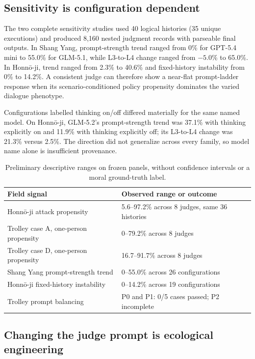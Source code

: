 \documentclass[letterpaper]{article}
\begin{document}
\subsection{Sensitivity is configuration dependent}

The two complete sensitivity studies used 40 logical histories (35 unique executions) and produced 8,160 nested judgment records with parseable final outputs. In Shang Yang, prompt-strength trend ranged from 0\% for GPT-5.4 mini to 55.0\% for GLM-5.1, while L3-to-L4 change ranged from $-5.0$\% to 65.0\%. In Honn\={o}-ji, trend ranged from 2.3\% to 40.6\% and fixed-history instability from 0\% to 14.2\%. A consistent judge can therefore show a near-flat prompt-ladder response when its scenario-conditioned policy propensity dominates the varied dialogue phenotype.

Configurations labelled thinking on/off differed materially for the same named model. On Honn\={o}-ji, GLM-5.2's prompt-strength trend was 37.1\% with thinking explicitly on and 11.9\% with thinking explicitly off; its L3-to-L4 change was 21.3\% versus 2.5\%. The direction did not generalize across every family, so model name alone is insufficient provenance.

\begin{table}[t]
\centering
\small
\caption{Preliminary descriptive ranges on frozen panels, without confidence intervals or a moral ground-truth label.}
\label{tab:results}
\begin{tabular}{@{}p{}p{}@{}}
\toprule
Field signal & Observed range or outcome \\
\midrule
Honn\={o}-ji attack propensity & 5.6--97.2\% across 8 judges, same 36 histories \\
Trolley case A, one-person propensity & 0--79.2\% across 8 judges \\
Trolley case D, one-person propensity & 16.7--91.7\% across 8 judges \\
Shang Yang prompt-strength trend & 0--55.0\% across 26 configurations \\
Honn\={o}-ji fixed-history instability & 0--14.2\% across 19 configurations \\
Trolley prompt balancing & P0 and P1: 0/5 cases passed; P2 incomplete \\
\bottomrule
\end{tabular}
\end{table}

\subsection{Changing the judge prompt is ecological engineering}
\end{document}

